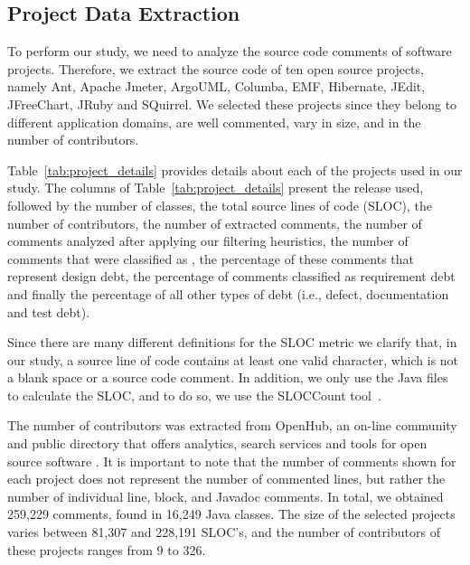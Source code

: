 \subsection{Project Data Extraction} %
\label{sub:data_extraction}

To perform our study, we need to analyze the source code comments of software projects. Therefore, we extract the source code of ten open source projects, namely Ant, Apache Jmeter, ArgoUML, Columba, EMF, Hibernate, JEdit, JFreeChart, JRuby and SQuirrel. We selected these projects since they belong to different application domains, are well commented, vary in size, and in the number of contributors. 

Table~\ref{tab:project_details} provides details about each of the projects used in our study. The columns of Table~\ref{tab:project_details} present the release used, followed by the number of classes, the total source lines of code (SLOC), the number of contributors, the number of extracted comments, the number of comments analyzed after applying our filtering heuristics, the number of comments that were classified as \SATD, the percentage of these comments that represent design debt, the percentage of \SATD comments classified as requirement debt and finally the percentage of all other types of debt (i.e., defect, documentation and test debt). 

Since there are many different definitions for the SLOC metric we clarify that, in our study, a source line of code contains at least one valid character, which is not a blank space or a source code comment. In addition, we only use the Java files to calculate the SLOC, and to do so, we use the SLOCCount tool~\cite{wheeler2004:home}. 

The number of contributors was extracted from OpenHub, an on-line community and public directory that offers analytics, search services and tools for open source software \cite{Openhub:home}. It is important to note that the number of comments shown for each project does not represent the number of commented lines, but rather the number of individual line, block, and Javadoc comments. In total, we obtained 259,229 comments, found in 16,249 Java classes. The size of the selected projects varies between 81,307 and 228,191 SLOC's, and the number of contributors of these projects ranges from 9 to 326. 

